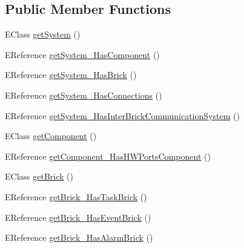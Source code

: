 \subsection*{Public Member Functions}
\begin{DoxyCompactItemize}
\item 
E\-Class \hyperlink{interfaceshootingmachineemfmodel_1_1_shootingmachineemfmodel_package_a1936896a13cbd8971d043eede86fabee}{get\-System} ()
\item 
E\-Reference \hyperlink{interfaceshootingmachineemfmodel_1_1_shootingmachineemfmodel_package_adc7471ec1870e5760e439544713b88d9}{get\-System\-\_\-\-Has\-Component} ()
\item 
E\-Reference \hyperlink{interfaceshootingmachineemfmodel_1_1_shootingmachineemfmodel_package_a844fa5d769431d4252191b936babf413}{get\-System\-\_\-\-Has\-Brick} ()
\item 
E\-Reference \hyperlink{interfaceshootingmachineemfmodel_1_1_shootingmachineemfmodel_package_ab675951279b79ccb5efa2a6b18b87914}{get\-System\-\_\-\-Has\-Connections} ()
\item 
E\-Reference \hyperlink{interfaceshootingmachineemfmodel_1_1_shootingmachineemfmodel_package_acec0faeb9791d36ea314a1f166abd0da}{get\-System\-\_\-\-Has\-Inter\-Brick\-Communication\-System} ()
\item 
E\-Class \hyperlink{interfaceshootingmachineemfmodel_1_1_shootingmachineemfmodel_package_a6d4775830611ba638cc97c20d99b2a5a}{get\-Component} ()
\item 
E\-Reference \hyperlink{interfaceshootingmachineemfmodel_1_1_shootingmachineemfmodel_package_affe1129e16800d7a340d1c20d7bf5091}{get\-Component\-\_\-\-Has\-H\-W\-Ports\-Component} ()
\item 
E\-Class \hyperlink{interfaceshootingmachineemfmodel_1_1_shootingmachineemfmodel_package_ac5d345f331ff0ccd58f979c044bfc51e}{get\-Brick} ()
\item 
E\-Reference \hyperlink{interfaceshootingmachineemfmodel_1_1_shootingmachineemfmodel_package_a7f5980e9b2a58022d285b476b3aab982}{get\-Brick\-\_\-\-Has\-Task\-Brick} ()
\item 
E\-Reference \hyperlink{interfaceshootingmachineemfmodel_1_1_shootingmachineemfmodel_package_ae3f0a3398912999226045e5ee0e06614}{get\-Brick\-\_\-\-Has\-Event\-Brick} ()
\item 
E\-Reference \hyperlink{interfaceshootingmachineemfmodel_1_1_shootingmachineemfmodel_package_a4deec1395013533807a17bda5d3a9b3e}{get\-Brick\-\_\-\-Has\-Alarm\-Brick} ()
\item 

\end{DoxyCompactItemize}
